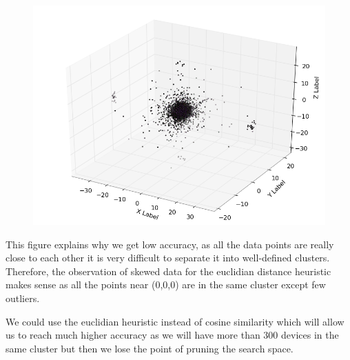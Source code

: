 \begin{figure}[H]
  \includegraphics[width=\linewidth]{./figs/points.png}
  \label{fig:points}
\end{figure}

This figure explains why we get low accuracy, as all the data points are really close to each
other it is very difficult to separate it into well-defined clusters. Therefore, the observation
of skewed data for the euclidian distance heuristic makes sense as all the points near (0,0,0) 
are in the same cluster except few outliers.

We could use the euclidian heuristic instead of cosine similarity which will allow us to reach 
much higher accuracy as we will have more than 300 devices in the same cluster but then we lose the
point of pruning the search space.
